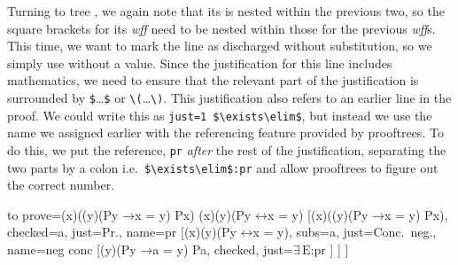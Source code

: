 \documentclass[10pt,british,a4paper]{ltxdoc}
\newcommand*\pkg[1]{\textsf{#1}}
\newcommand*{\lif}{\ensuremath{\mathbin{\rightarrow}}}
\newcommand*{\liff}{\ensuremath{\mathbin{\leftrightarrow}}}
\newcommand*{\elim}{\,\text{E}}
\newcommand*\wff{\emph{wff}}
\begin{document}
Turning to tree \nyth*{}, we again note that its \bocsnyth{} is nested within the previous two, so the square brackets for its \wff{} need to be nested within those for the previous \wff{}s.
This time, we want to mark the line as discharged without substitution, so we simply use  without a value.
Since the justification for this line includes mathematics, we need to ensure that the relevant part of the justification is surrounded by \verb|$|\dots\verb|$| or \verb|\(|\dots\verb|\)|.
This justification also refers to an earlier line in the proof.
We could write this as \verb|just=1 $\exists\elim$|, but instead we use the name we assigned earlier with the referencing feature provided by \pkg{prooftrees}.
To do this, we put the reference, \verb|pr| \emph{after} the rest of the justification, separating the two parts by a colon i.e.~\verb|$\exists\elim$:pr| and allow \pkg{prooftrees} to figure out the correct number.
\begin{latexcode}
\begin{prooftree}
  {
    to prove={(\exists x)((\forall y)(Py \lif x = y) \land Px) \sststile{}{} (\exists x)(\forall y)(Py \liff x = y)}
  }
  [{(\exists x)((\forall y)(Py \lif x = y) \land Px)}, checked=a, just=Pr., name=pr
    [{\lnot (\exists x)(\forall y)(Py \liff x = y)}, subs=a, just=Conc.~neg., name=neg conc
      [{(\forall y)(Py \lif a = y) \land Pa}, checked, just=$\exists\elim$:pr
      ]
    ]
  ]
\end{prooftree}
\end{latexcode}
\end{document}
